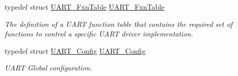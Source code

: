 \begin{DoxyCompactItemize}
typedef struct \hyperlink{struct_u_a_r_t___fxn_table}{U\-A\-R\-T\-\_\-\-Fxn\-Table} \hyperlink{_u_a_r_t_8h_a24d497f125179ba5e5b16ad9a0aa249d}{U\-A\-R\-T\-\_\-\-Fxn\-Table}
\begin{DoxyCompactList}\small\item\em The definition of a U\-A\-R\-T function table that contains the required set of functions to control a specific U\-A\-R\-T driver implementation. \end{DoxyCompactList}\item 
typedef struct \hyperlink{struct_u_a_r_t___config}{U\-A\-R\-T\-\_\-\-Config} \hyperlink{_u_a_r_t_8h_ae513322c7d3184d66173cba9349989a4}{U\-A\-R\-T\-\_\-\-Config}
\begin{DoxyCompactList}\small\item\em U\-A\-R\-T Global configuration. \end{DoxyCompactList}\end{DoxyCompactItemize}
